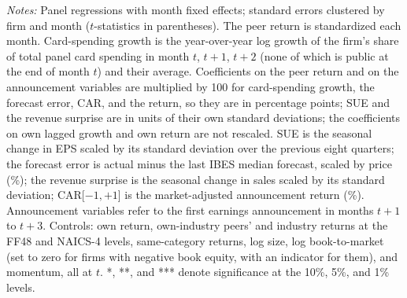 \begin{table}
\par\vspace{4pt}\begin{minipage}{\linewidth}\scriptsize \emph{Notes:} Panel regressions with month fixed effects; standard errors clustered by firm and month ($t$-statistics in parentheses). The peer return is standardized each month. Card-spending growth is the year-over-year log growth of the firm's share of total panel card spending in month $t$, $t+1$, $t+2$ (none of which is public at the end of month $t$) and their average. Coefficients on the peer return and on the announcement variables are multiplied by 100 for card-spending growth, the forecast error, CAR, and the return, so they are in percentage points; SUE and the revenue surprise are in units of their own standard deviations; the coefficients on own lagged growth and own return are not rescaled. SUE is the seasonal change in EPS scaled by its standard deviation over the previous eight quarters; the forecast error is actual minus the last IBES median forecast, scaled by price (\%); the revenue surprise is the seasonal change in sales scaled by its standard deviation; CAR[$-1,+1$] is the market-adjusted announcement return (\%). Announcement variables refer to the first earnings announcement in months $t+1$ to $t+3$. Controls: own return, own-industry peers' and industry returns at the FF48 and NAICS-4 levels, same-category returns, log size, log book-to-market (set to zero for firms with negative book equity, with an indicator for them), and momentum, all at $t$. *, **, and *** denote significance at the 10\%, 5\%, and 1\% levels.\end{minipage}
\end{table}